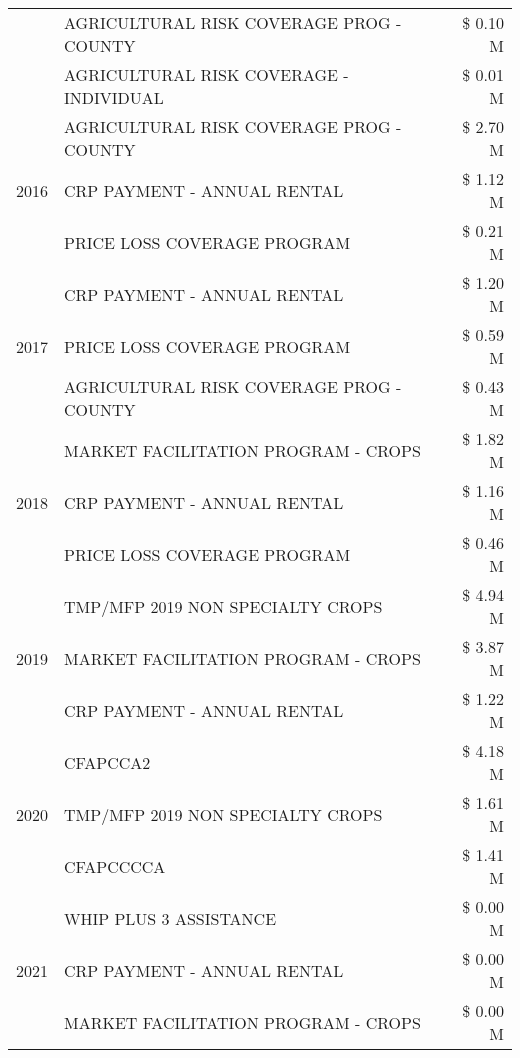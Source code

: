 \begin{tabular}{llr}
 & AGRICULTURAL RISK COVERAGE PROG - COUNTY & \$ 0.10 M \\
 & AGRICULTURAL RISK COVERAGE - INDIVIDUAL & \$ 0.01 M \\
\cline{1-3}
\multirow[t]{3}{*}{2016} & AGRICULTURAL RISK COVERAGE PROG - COUNTY & \$ 2.70 M \\
 & CRP PAYMENT - ANNUAL RENTAL & \$ 1.12 M \\
 & PRICE LOSS COVERAGE PROGRAM & \$ 0.21 M \\
\cline{1-3}
\multirow[t]{3}{*}{2017} & CRP PAYMENT - ANNUAL RENTAL & \$ 1.20 M \\
 & PRICE LOSS COVERAGE PROGRAM & \$ 0.59 M \\
 & AGRICULTURAL RISK COVERAGE PROG - COUNTY & \$ 0.43 M \\
\cline{1-3}
\multirow[t]{3}{*}{2018} & MARKET FACILITATION PROGRAM - CROPS & \$ 1.82 M \\
 & CRP PAYMENT - ANNUAL RENTAL & \$ 1.16 M \\
 & PRICE LOSS COVERAGE PROGRAM & \$ 0.46 M \\
\cline{1-3}
\multirow[t]{3}{*}{2019} & TMP/MFP 2019 NON SPECIALTY CROPS & \$ 4.94 M \\
 & MARKET FACILITATION PROGRAM - CROPS & \$ 3.87 M \\
 & CRP PAYMENT - ANNUAL RENTAL & \$ 1.22 M \\
\cline{1-3}
\multirow[t]{3}{*}{2020} & CFAPCCA2 & \$ 4.18 M \\
 & TMP/MFP 2019 NON SPECIALTY CROPS & \$ 1.61 M \\
 & CFAPCCCCA & \$ 1.41 M \\
\cline{1-3}
\multirow[t]{3}{*}{2021} & WHIP PLUS 3 ASSISTANCE & \$ 0.00 M \\
 & CRP PAYMENT - ANNUAL RENTAL & \$ 0.00 M \\
 & MARKET FACILITATION PROGRAM - CROPS & \$ 0.00 M \\
\cline{1-3}
\bottomrule
\end{tabular}
